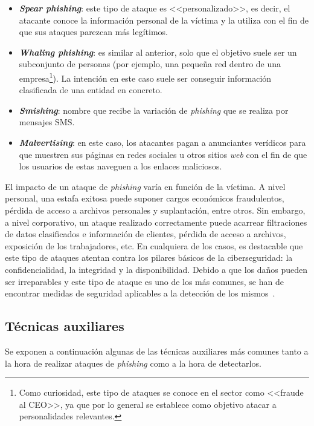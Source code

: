 \begin{itemize}
	\item \textbf{\textit{Spear phishing}}: este tipo de ataque es <<personalizado>>, es decir, el atacante conoce la información personal de la víctima y la utiliza con el fin de que sus ataques parezcan más legítimos.
	
	\item \textbf{\textit{Whaling phishing}}: es similar al anterior, solo que el objetivo suele ser un subconjunto de personas (por ejemplo, una pequeña red dentro de una empresa\footnote{Como curiosidad, este tipo de ataques se conoce en el sector como <<fraude al CEO>>, ya que por lo general se establece como objetivo atacar a personalidades relevantes.}). La intención en este caso suele ser conseguir información clasificada de una entidad en concreto.
	\item \textbf{\textit{Smishing}}: nombre que recibe la variación de \textit{phishing} que se realiza por mensajes SMS.
	\item \textbf{\textit{Malvertising}}: en este caso, los atacantes pagan a anunciantes verídicos para que muestren sus páginas en redes sociales u otros sitios \textit{web} con el fin de que los usuarios de estas naveguen a los enlaces maliciosos.
\end{itemize}

El impacto de un ataque de \textit{phishing} varía en función de la víctima. A nivel personal, una estafa exitosa puede suponer cargos económicos fraudulentos, pérdida de acceso a archivos personales y suplantación, entre otros. Sin embargo, a nivel corporativo, un ataque realizado correctamente puede acarrear filtraciones de datos clasificados e información de clientes, pérdida de acceso a archivos, exposición de los trabajadores, etc. En cualquiera de los casos, es destacable que este tipo de ataques atentan contra los pilares básicos de la ciberseguridad: la confidencialidad, la integridad y la disponibilidad. Debido a que los daños pueden ser irreparables y este tipo de ataque es uno de los más comunes, se han de encontrar medidas de seguridad aplicables a la detección de los mismos~\cite{phishingMicrosoft}.



\subsection{Técnicas auxiliares}

Se exponen a continuación algunas de las técnicas auxiliares más comunes tanto a la hora de realizar ataques de \textit{phishing} como a la hora de detectarlos.

